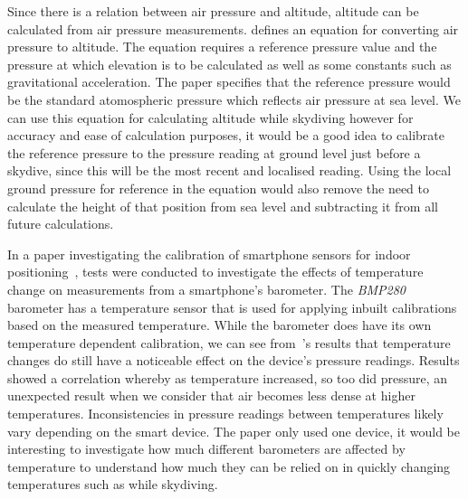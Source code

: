 \documentclass[11pt, twocolumn]{article}
\begin{document}
Since there is a relation between air pressure and altitude, altitude can be calculated from air pressure measurements. \textcite{liu_beyond_2014} defines an equation for converting air pressure to altitude. The equation requires a reference pressure value and the pressure at which elevation is to be calculated as well as some constants such as gravitational acceleration. The paper specifies that the reference pressure would be the standard atomospheric pressure which reflects air pressure at sea level. We can use this equation for calculating altitude while skydiving however for accuracy and ease of calculation purposes, it would be a good idea to calibrate the reference pressure to the pressure reading at ground level just before a skydive, since this will be the most recent and localised reading. Using the local ground pressure for reference in the equation would also remove the need to calculate the height of that position from sea level and subtracting it from all future calculations.

In a paper investigating the calibration of smartphone sensors for indoor positioning~\cite{keller_calibration_2012}, tests were conducted to investigate the effects of temperature change on measurements from a smartphone's barometer. The \textit{BMP280} barometer has a temperature sensor that is used for applying inbuilt calibrations based on the measured temperature. While the barometer does have its own temperature dependent calibration, we can see from~\citeauthor{keller_calibration_2012}'s results that temperature changes do still have a noticeable effect on the device's pressure readings. Results showed a correlation whereby as temperature increased, so too did pressure, an unexpected result when we consider that air becomes less dense at higher temperatures. Inconsistencies in pressure readings between temperatures likely vary depending on the smart device. The paper only used one device, it would be interesting to investigate how much different barometers are affected by temperature to understand how much they can be relied on in quickly changing temperatures such as while skydiving.
\end{document}
